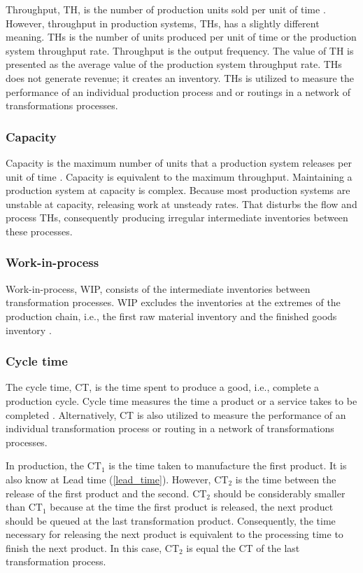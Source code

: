 \documentclass{article}
\begin{document}
Throughput, TH, is the number of production units sold per unit of time \citep{Hopp2001}.
However, throughput in production systems, THs, has a slightly different meaning.
THs is the number of units produced per unit of time or the production system throughput rate.
Throughput is the output frequency.
The value of TH is presented as the average value of the production system throughput rate.
THs does not generate revenue; it creates an inventory.
THs is utilized to measure the performance of an individual production process and or routings in a network of transformations processes.

\subsubsection{Capacity \label{capacity}}
\label{sec:org30b2b03}

Capacity is the maximum number of units that a production system releases per unit of time \citep{Hopp2001}.
Capacity is equivalent to the maximum throughput.
Maintaining a production system at capacity is complex.
Because most production systems are unstable at capacity, releasing work at unsteady rates.
That disturbs the flow and process THs, consequently producing irregular intermediate inventories between these processes.


\subsubsection{Work-in-process \label{work-in-process}}
\label{sec:org0fca926}

Work-in-process, WIP, consists of the intermediate inventories between transformation processes.
WIP excludes the inventories at the extremes of the production chain, i.e., the first raw material inventory and the finished goods inventory \citep{Hopp2001}.

\subsubsection{Cycle time \label{cycle_time}}
\label{sec:orgf568b3a}

The cycle time, CT, is the time spent to produce a good, i.e., complete a production cycle.
Cycle time measures the time a product or a service takes to be completed \citep{Hopp2001}.
Alternatively, CT is also utilized to measure the performance of an individual transformation process or routing in a network of transformations processes.

In production, the \(\mbox{CT}_1\) is the time taken to manufacture the first product.
It is also know at Lead time (\ref{lead_time}).
However, \(\mbox{CT}_2\) is the time between the release of the first product and the second.
\(\mbox{CT}_2\) should be considerably smaller than \(\mbox{CT}_1\) because at the time the first product is released, the next product should be queued at the last transformation product.
Consequently, the time necessary for releasing the next product is equivalent to the processing time to finish the next product.
In this case, \(\mbox{CT}_2\) is equal the CT of the last transformation process.
\end{document}
